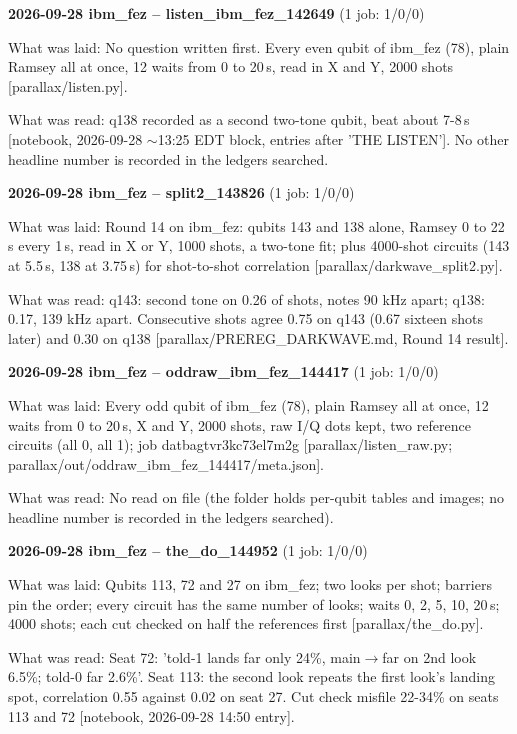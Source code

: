 \documentclass[11pt]{article}
\begin{document}
\textbf{2026-09-28 ibm\_fez -- listen\_ibm\_fez\_142649} (1 job: 1/0/0)

What was laid: No question written first. Every even qubit of ibm\_fez (78), plain Ramsey all at once, 12 waits from 0 to 20\,\textmu s, read in X and Y, 2000 shots {[}parallax/listen.py{]}.

What was read: q138 recorded as a second two-tone qubit, beat about 7-8\,\textmu s {[}notebook, 2026-09-28 \(\sim\)13:25 EDT block, entries after 'THE LISTEN'{]}. No other headline number is recorded in the ledgers searched.

\textbf{2026-09-28 ibm\_fez -- split2\_143826} (1 job: 1/0/0)

What was laid: Round 14 on ibm\_fez: qubits 143 and 138 alone, Ramsey 0 to 22\,\textmu s every 1\,\textmu s, read in X or Y, 1000 shots, a two-tone fit; plus 4000-shot circuits (143 at 5.5\,\textmu s, 138 at 3.75\,\textmu s) for shot-to-shot correlation {[}parallax/darkwave\_split2.py{]}.

What was read: q143: second tone on 0.26 of shots, notes 90 kHz apart; q138: 0.17, 139 kHz apart. Consecutive shots agree 0.75 on q143 (0.67 sixteen shots later) and 0.30 on q138 {[}parallax/PREREG\_DARKWAVE.md, Round 14 result{]}.

\textbf{2026-09-28 ibm\_fez -- oddraw\_ibm\_fez\_144417} (1 job: 1/0/0)

What was laid: Every odd qubit of ibm\_fez (78), plain Ramsey all at once, 12 waits from 0 to 20\,\textmu s, X and Y, 2000 shots, raw I/Q dots kept, two reference circuits (all 0, all 1); job datbagtvr3kc73el7m2g {[}parallax/listen\_raw.py; parallax/out/oddraw\_ibm\_fez\_144417/meta.json{]}.

What was read: No read on file (the folder holds per-qubit tables and images; no headline number is recorded in the ledgers searched).

\textbf{2026-09-28 ibm\_fez -- the\_do\_144952} (1 job: 1/0/0)

What was laid: Qubits 113, 72 and 27 on ibm\_fez; two looks per shot; barriers pin the order; every circuit has the same number of looks; waits 0, 2, 5, 10, 20\,\textmu s; 4000 shots; each cut checked on half the references first {[}parallax/the\_do.py{]}.

What was read: Seat 72: 'told-1 lands far only 24\%, main\(\to\)far on 2nd look 6.5\%; told-0 far 2.6\%'. Seat 113: the second look repeats the first look's landing spot, correlation 0.55 against 0.02 on seat 27. Cut check misfile 22-34\% on seats 113 and 72 {[}notebook, 2026-09-28 14:50 entry{]}.
\end{document}
